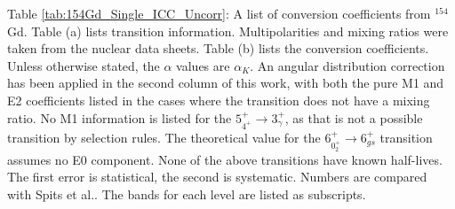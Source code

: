 \begin{landscape}
\begin{table}
\begin{ThreePartTable}
\end{ThreePartTable}
\end{table}
\begin{table}
    \begin{ThreePartTable}
\begin{tablenotes}
    Table \ref{tab:154Gd_Single_ICC_Uncorr}: A list of conversion coefficients from $^{154}$Gd. Table (a) lists transition information. Multipolarities and mixing ratios were taken from the nuclear data sheets\citep{reich09:_nds_154}. Table (b) lists the conversion coefficients. Unless otherwise stated, the $\alpha$ values are $\alpha_K$. An angular distribution correction has been applied in the second column of this work, with both the pure M1 and E2 coefficients listed in the cases where the transition does not have a mixing ratio. No M1 information is listed for the $5^+_{4^+}	\rightarrow	3^+_{\gamma}$, as that is not a possible transition by selection rules. The theoretical value for the $6^+_{0^+_2}	\rightarrow	6^+_{gs}$ transition assumes no E0 component. None of the above transitions have known half-lives. The first error is statistical, the second is systematic. Numbers are compared with Spits et al.\citep{spits96:_154gd}. The bands for each level are listed as subscripts.
 \end{tablenotes}
\end{ThreePartTable}
\end{table}
\end{landscape}